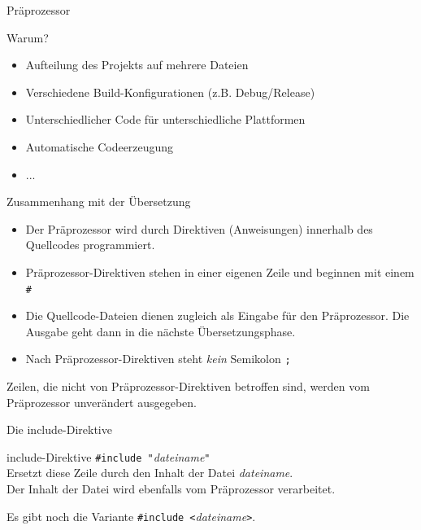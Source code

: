 \begin{frame}{Präprozessor}
	\begin{block}{Warum?}
		\begin{itemize}
			\item Aufteilung des Projekts auf mehrere Dateien
			\item Verschiedene Build-Konfigurationen (z.B. Debug/Release)
			\item Unterschiedlicher Code für unterschiedliche Plattformen
			\item Automatische Codeerzeugung
			\item ...
		\end{itemize}
	\end{block}
\end{frame}

\begin{frame}[fragile]{Zusammenhang mit der Übersetzung}
	\begin{itemize}
		\item Der Präprozessor wird durch Direktiven (Anweisungen) innerhalb des Quellcodes programmiert.
		\item Präprozessor-Direktiven stehen in einer eigenen Zeile und beginnen mit einem \verb|#|
		\item Die Quellcode-Dateien dienen zugleich als Eingabe für den Präprozessor. Die Ausgabe geht dann in die nächste Übersetzungsphase.
		\item Nach Präprozessor-Direktiven steht \emph{kein} Semikolon \verb|;|
	\end{itemize}
	
	\pause
	\vspace{1em}
	
 	Zeilen, die nicht von Präprozessor-Direktiven betroffen sind, werden vom Präprozessor unverändert ausgegeben.
\end{frame}

\begin{frame}[fragile]{Die include-Direktive}
	\begin{block}{include-Direktive}
		\verb|#include "|\emph{dateiname}\verb|"| \\
		\vspace{0.5em}
		Ersetzt diese Zeile durch den Inhalt der Datei \emph{dateiname}. \\
		Der Inhalt der Datei wird ebenfalls vom Präprozessor verarbeitet.
	\end{block}
	
	\pause
	\vspace{1em}
	
	\small
	Es gibt noch die Variante \verb|#include <|\emph{dateiname}\verb|>|.
\end{frame}


